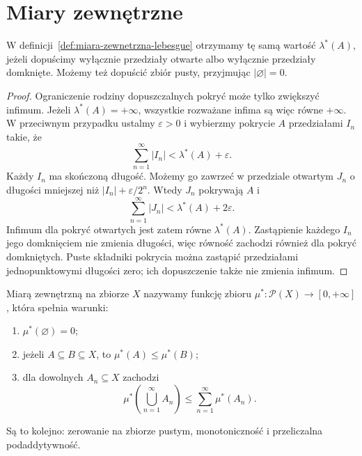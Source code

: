 \section{Miary zewnętrzne}
\label{sec:miary-zewnetrzne}

\begin{uwaga}
\label{uw:rodzaje-pokryc}
W definicji~\ref{def:miara-zewnetrzna-lebesgue} otrzymamy tę samą
wartość $\lambda^{\ast}(A)$, jeżeli dopuścimy wyłącznie przedziały
otwarte albo wyłącznie przedziały domknięte. Możemy też dopuścić
zbiór pusty, przyjmując $|\varnothing|=0$.
\end{uwaga}

\begin{proof}
Ograniczenie rodziny dopuszczalnych pokryć może tylko zwiększyć infimum.
Jeżeli $\lambda^{\ast}(A)=+\infty$, wszystkie rozważane infima są więc
równe $+\infty$. W przeciwnym przypadku ustalmy $\varepsilon>0$
i wybierzmy pokrycie $A$ przedziałami $I_n$ takie, że
\[
  \sum_{n=1}^{\infty}|I_n|<\lambda^{\ast}(A)+\varepsilon.
\]
Każdy $I_n$ ma skończoną długość. Możemy go zawrzeć w przedziale
otwartym $J_n$ o długości mniejszej niż $|I_n|+\varepsilon/2^n$.
Wtedy $J_n$ pokrywają $A$ i
\[
  \sum_{n=1}^{\infty}|J_n|<\lambda^{\ast}(A)+2\varepsilon.
\]
Infimum dla pokryć otwartych jest zatem równe $\lambda^{\ast}(A)$.
Zastąpienie każdego $I_n$ jego domknięciem nie zmienia długości,
więc równość zachodzi również dla pokryć domkniętych.
Puste składniki pokrycia można zastąpić przedziałami jednopunktowymi
długości zero; ich dopuszczenie także nie zmienia infimum.
\end{proof}

\begin{samepage}
\begin{definicja}
\label{def:miara-zewnetrzna}
Miarą zewnętrzną na zbiorze $X$ nazywamy funkcję zbioru
$\mu^{\ast}\colon\mathcal{P}(X)\to[0,+\infty]$, która spełnia warunki:
\begin{enumerate}
  \item $\mu^{\ast}(\varnothing)=0$;
  \item jeżeli $A\subseteq B\subseteq X$, to
    $\mu^{\ast}(A)\leq\mu^{\ast}(B)$;
  \item dla dowolnych $A_n\subseteq X$ zachodzi
    \[
      \mu^{\ast}\left(\bigcup_{n=1}^{\infty}A_n\right)
      \leq\sum_{n=1}^{\infty}\mu^{\ast}(A_n).
    \]
\end{enumerate}
Są to kolejno: zerowanie na zbiorze pustym, monotoniczność
i przeliczalna podaddytywność.
\end{definicja}
\end{samepage}

